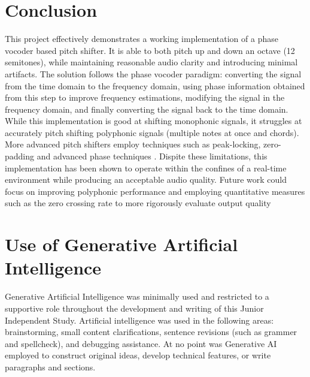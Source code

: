 \documentclass[12pt]{article}
\begin{document}


\section{Conclusion}
This project effectively demonstrates a working implementation of a phase vocoder based pitch shifter. It is able to both pitch up and down an octave (12 semitones), while maintaining 
reasonable audio clarity and introducing minimal artifacts. The solution follows the phase vocoder paradigm: converting the signal from the time domain to the frequency domain, using phase information obtained from 
this step to improve frequency estimations, modifying the signal in the frequency domain, and finally converting the signal back to the time domain.
While this implementation is good at shifting monophonic signals, it struggles at accurately pitch shifting polyphonic signals (multiple notes at once and chords). More advanced pitch shifters
employ techniques such as peak-locking, zero-padding and advanced phase techniques \cite{royer2019pitch}. Dispite these limitations, this implementation has been shown to operate within the confines of 
a real-time environment while producing an acceptable audio quality. Future work could focus on improving polyphonic performance and employing quantitative measures such as the zero crossing rate to more rigorously evaluate output quality 


\appendix 
\section{Use of Generative Artificial Intelligence}

Generative Artificial Intelligence was minimally used and restricted to a supportive role throughout the development and writing of this Junior Independent Study.
Artificial intelligence was used in the following areas: brainstorming, small content clarifications, sentence revisions (such as grammer and spellcheck), and debugging assistance. 
At no point was Generative AI employed to construct original ideas, develop technical features, or write paragraphs and sections. 
\end{document}
